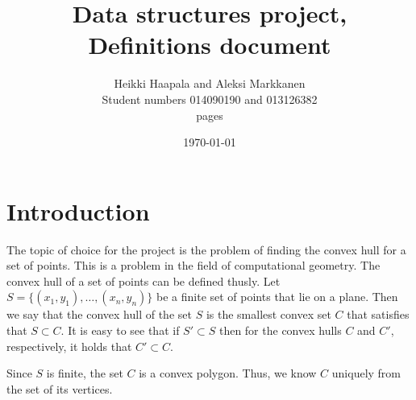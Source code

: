 \documentclass[a4paper,12pt,leqno,titlepage]{article}
\begin{document}
\begin{titlepage}
\title{Data structures project, \\
Definitions document}
\author{Heikki Haapala and Aleksi Markkanen\\
Student numbers 014090190 and 013126382\\
\pageref{LastPage} pages}
\date{\today}
\end{titlepage}
\maketitle
\pagebreak
\tableofcontents
\pagebreak






\section{Introduction}
The topic of choice for the project is the problem of finding the convex hull for a set of points.
This is a problem in the field of computational geometry.
The convex hull of a set of points can be defined thusly.
Let $S = \{(x_1,y_1),\ldots,(x_n,y_n)\}$ be a finite set of points that lie on a plane.
Then we say that the convex hull of the set $S$ is the smallest convex set $C$ that satisfies that $S \subset C$.
It is easy to see that if $S' \subset S$ then for the convex hulls $C$ and $C'$, respectively, it holds that $C' \subset C$.


Since $S$ is finite, the set $C$ is a convex polygon.
Thus, we know $C$ uniquely from the set of its vertices.
\end{document}
